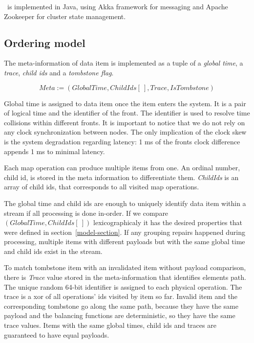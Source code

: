 \label{fs-impl}

\FlameStream\ is implemented in Java, using Akka framework for messaging and Apache Zookeeper for cluster state management.

\subsection{Ordering model}
The meta-information of data item is implemented as a tuple of a {\it global time}, a {\it trace}, {\it child ids} and a {\it tombstone flag}.

\[Meta := (GlobalTime, ChildIds[\:], Trace, IsTombstone)\]

Global time is assigned to data item once the item enters the system. It is a pair of logical time and the identifier of the front. The identifier is used to resolve time collisions within different fronts. It is important to notice that we do not rely on any clock synchronization between nodes. The only implication of the clock skew is the system degradation regarding latency: 1 ms of the fronts clock difference appends 1 ms to minimal latency.

Each map operation can produce multiple items from one.  An ordinal number, child id, is stored in the meta information to differentiate them. {\it ChildIds} is an array of child ids, that corresponds to all visited map operations.

The global time and child ids are enough to uniquely identify data item within a stream if all processing is done in-order. If we compare $(GlobalTime, ChildIds[\:])$ lexicographicaly it has the desired properties that were defined in section~\ref{model-section}. If any grouping repairs happened during processing, multiple items with different payloads but with the same global time and child ids exist in the stream.

To match tombstone item with an invalidated item without payload comparison, there is {\it Trace} value stored in the meta-information that identifies elements path. The unique random 64-bit identifier is assigned to each physical operation. The trace is a xor of all operations' ids visited by item so far. Invalid item and the corresponding tombstone go along the same path, because they have the same payload and the balancing functions are deterministic, so they have the same trace values. Items with the same global times, child ids and traces are guaranteed to have equal payloads.

\label{mininal-time}

